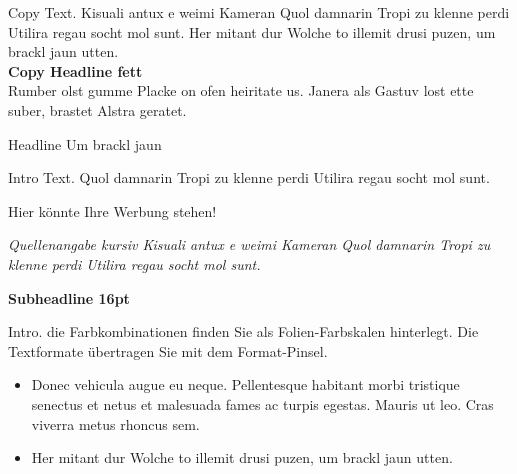 \documentclass[
notumble,%
langpaper]{tubsleaflet}
\begin{document}
\begin{gausspage}
  \begin{segment}[bgcolor=tubsBlue40]{8}
    Copy Text. Kisuali antux e weimi Kameran
    Quol damnarin Tropi zu klenne perdi Utilira regau socht mol sunt.
    Her mitant dur Wolche to illemit drusi puzen, um brackl jaun utten.\\[3ex]

    {\bfseries Copy Headline fett}\\
    Rumber olst gumme Placke on ofen heiritate us.
    Janera als Gastuv lost ette suber, brastet Alstra geratet.
  \end{segment}
\end{gausspage}

\raggedright%
\begin{gausspage}
  \begin{segment}[bgcolor=tubsBlue40]{2}
     Headline Um brackl jaun\par
    
     Intro Text. Quol damnarin Tropi zu klenne perdi 
      Utilira regau socht mol sunt.
  \end{segment}
  \begin{segment}[c,bgcolor=tubsGray20,fgcolor=tubsGray40]{2}
    \centering\large
    Hier könnte Ihre Werbung stehen!
  \end{segment}
  \begin{segment}[bgcolor=tubsBlue60]{4}
    \fontsize{8pt}{10}\selectfont\itshape
    Quellenangabe kursiv Kisuali antux e weimi Kameran Quol damnarin Tropi
    zu klenne perdi Utilira regau socht mol sunt.
  \end{segment}
\end{gausspage}

\begin{gausspage}
  \begin{segment}[bgcolor=tubsBlue60]{3}
    \bfseries Subheadline 16pt
    
    Intro. die Farbkombinationen finden Sie als Folien-Farbskalen hinterlegt.
    Die Textformate übertragen Sie mit dem Format-Pinsel.
  \end{segment}
  \begin{segment}[bgcolor=tubsBlue40]{5}
  
    \begin{itemize}
      \item Donec vehicula augue eu neque. Pellentesque habitant morbi
        tristique senectus et netus et malesuada fames ac turpis egestas.
        Mauris ut leo. Cras viverra metus rhoncus sem.

      \item Her mitant dur Wolche to illemit drusi puzen, um brackl jaun utten.
    \end{itemize}
  \end{segment}
\end{gausspage}
\end{document}
